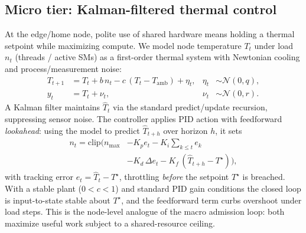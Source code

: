 \subsection{Micro tier: Kalman-filtered thermal control}
\label{sec:thermal}
At the edge/home node, polite use of shared hardware means holding a thermal
setpoint while maximizing compute. We model node temperature $T_t$ under load
$n_t$ (threads / active SMs) as a first-order thermal system with Newtonian
cooling and process/measurement noise:
\begin{align}
T_{t+1} &= T_t + b\,n_t - c\,(T_t - T_{\mathrm{amb}}) + \eta_t, & \eta_t&\sim\mathcal N(0,q),\\
y_t &= T_t + \nu_t, & \nu_t&\sim\mathcal N(0,r).
\end{align}
A Kalman filter maintains $\hat T_t$ via the standard predict/update recursion,
suppressing sensor noise. The controller applies PID action with feedforward
\emph{lookahead}: using the model to predict $\hat T_{t+h}$ over horizon $h$, it sets
\begin{equation}
\begin{split}
n_t = \mathrm{clip}\big(n_{\max} &- K_p e_t - K_i\textstyle\sum_{k\le t} e_k \\
                       &- K_d\,\Delta e_t - K_{\!f}\,(\hat T_{t+h}-T^{\star})\big),
\end{split}
\end{equation}
with tracking error $e_t=\hat T_t-T^{\star}$, throttling \emph{before} the
setpoint $T^{\star}$ is breached. With a stable plant
($0<c<1$) and standard PID gain conditions the closed loop is input-to-state
stable about $T^{\star}$, and the feedforward term curbs overshoot under load
steps. This is the node-level analogue of the macro admission loop: both maximize
useful work subject to a shared-resource ceiling.
